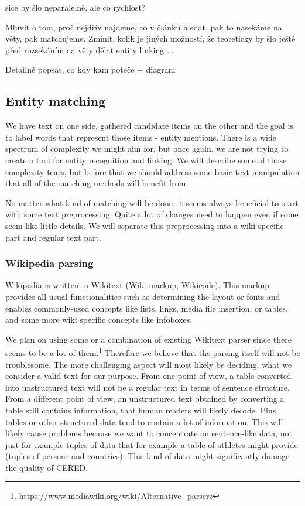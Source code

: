 sice by šlo neparalelně, ale co rychlost?

Mluvit o tom, proč nejdřív najdeme, co v článku hledat, pak to nasekáme na věty, pak matchujeme. Zmínit, kolik je jiných možností, že teoreticky by šlo ještě před rozsekáním na věty dělat entity linking ...

Detailně popsat, co kdy kam poteče + diagram


\subsection{Entity matching}

We have text on one side, gathered candidate items on the other and the goal is to label words that represent those items - entity mentions. There is a wide spectrum of complexity we might aim for, but once again, we are not trying to create a tool for entity recognition and linking. We will describe some of those complexity tears, but before that we should address some basic text manipulation that all of the matching methods will benefit from.



No matter what kind of matching will be done, it seems always beneficial to start with some text preprocessing. Quite a lot of changes need to happen even if some seem like little details. We will separate this preprocessing into a wiki specific part and regular text part. 

\subsubsection{Wikipedia parsing}
Wikipedia is written in Wikitext (Wiki markup, Wikicode). This markup provides all usual functionalities such as determining the layout or fonts and enables commonly-used concepts like lists, links, media file insertion, or tables, and some more wiki specific concepts like infoboxes.

We plan on using some or a combination of existing Wikitext parser since there seems to be a lot of them.\footnote{https://www.mediawiki.org/wiki/Alternative\_parsers} Therefore we believe that the parsing itself will not be troublesome. The more challenging aspect will most likely be deciding, what we consider a valid text for our purpose. From one point of view, a table converted into unstructured text will not be a regular text in terms of sentence structure. From a different point of view, an unstructured text obtained by converting a table still contains information, that human readers will likely decode. Plus, tables or other structured data tend to contain a lot of information. This will likely cause problems because we want to concentrate on sentence-like data, not just for example tuples of data that for example a table of athletes might provide (tuples of persons and countries). This kind of data might significantly damage the quality of CERED.

